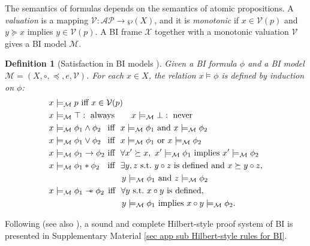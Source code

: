 \documentclass[conference,compsoc, 10pt]{IEEEtran}
\newtheorem{definition}{Definition}[section]
\newcommand {\cM } {{\mathcal{M}}}
\newcommand {\cV } {{\mathcal{V}}}
\newcommand {\cX } {{\mathcal{X}}}
\newcommand {\sepimp} {\mathrel{-\mkern-6mu*}}
\newcommand {\AP} {{\mathcal{AP}}}
\begin{document}
  The semantics of formulas depends on the semantics of atomic propositions.  A
  \emph{valuation} is a mapping $\cV: \AP \rightarrow \wp(X)$, and it is
  \emph{monotonic} if $x\in\cV(p)$ and $y \succeq x$ implies $y \in \cV(p)$. A
  BI frame $\cX$ together with a monotonic valuation $\cV$ gives a BI model
  $\cM$.
	
	\begin{definition}[Satisfaction in BI models \cite{OP99}]
		\label{def satisfaction BI}
    Given a BI formula $\phi$ and a BI model $\cM = (X,\circ,\preceq,e,\cV)$.
    For each $x\in X$, the relation $x\models \phi$ is defined by induction on
    $\phi$:
		\begin{align*}
		&  x\models_\cM p \ \text{\rm iff}\ x\in\cV(p)\\
		&  x\models_\cM \top :\  \text{always} \qquad
		x\models_\cM \bot :\  \text{never} \\
		&  x\models_\cM \phi_1\wedge\phi_2 \ \ \;\!  \text{\rm iff}\ \ x\models_\cM\phi_1\ \text{and}\ x\models_\cM\phi_2 \\
		&  x\models_\cM \phi_1\vee\phi_2   \ \ \;\!  \text{\rm iff}\ \ x\models_\cM\phi_1\ \text{or}\ x\models_\cM\phi_2\\
		&  x\models_\cM \phi_1\rightarrow\phi_2  \  \text{\rm iff}\ \ \forall x^\prime\succeq x,\ x^\prime\models_\cM\phi_1\ \text{implies}\ x^\prime\models_\cM\phi_2\\
		&  x\models_\cM \phi_1\ast\phi_2  \ \ \ \;\!\! \text{\rm iff}\ \ \exists y,z\ \text{s.t.}\ y\circ z\ \text{is defined and}\ x \succeq y\circ z,\\ 
		&\qquad\qquad\qquad\qquad\ \  y\models_\cM \phi_1\ \text{and}\ z\models_\cM\phi_2 \\
		&  x\models_\cM \phi_1\sepimp\phi_2  \ \;\! \text{\rm iff}\ \ \forall y\ \text{s.t.}\ x\circ y\ \text{is defined}, \\ 
		&\qquad\qquad\qquad\qquad\ \   y\models_\cM \phi_1\ \text{implies}\ x\circ y\models_\cM \phi_2. 
		\end{align*}
	\end{definition}
	
	
  Following \cite{Pym02} (see also \cite{Doc19}), a sound and complete
  Hilbert-style proof system of BI is presented in Supplementary Material \ref{sec app sub Hilbert-style rules for BI}.
	
\end{document}
